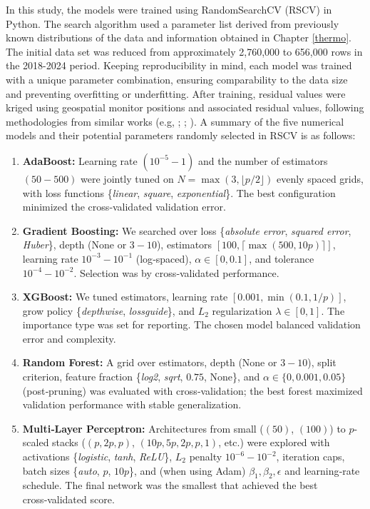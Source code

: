 In this study, the models were trained using RandomSearchCV (RSCV) in Python. The search algorithm used a parameter list derived from previously known distributions of the data and information obtained in Chapter \ref{thermo}. The initial data set was reduced from approximately 2,760,000 to 656,000 rows in the 2018-2024 period. Keeping reproducibility in mind, each model was trained with a unique parameter combination, ensuring comparability to the data size and preventing overfitting or underfitting. After training, residual values were kriged using geospatial monitor positions and associated residual values, following methodologies from similar works (e.g, \cite{anand_gis-based_2021}; \cite{liu_improve_2018}; \cite{oliver_tutorial_2014}). A summary of the five numerical models and their potential parameters randomly selected in RSCV is as follows:
\begin{enumerate}
    \item \textbf{AdaBoost:} Learning rate \((10^{-5}\!-\!1)\) and the number of estimators \((50\!-\!500)\) were jointly tuned on \(N=\max(3,\lfloor p/2\rfloor)\) evenly spaced grids, with loss functions \{\emph{linear}, \emph{square}, \emph{exponential}\}. The best configuration minimized the cross‑validated validation error.
    \item \textbf{Gradient Boosting:} We searched over loss \{\emph{absolute error}, \emph{squared error}, \emph{Huber}\}, depth (None or \(3\!-\!10\)), estimators \([100,\lceil\max(500,10p)\rceil]\), learning rate \(10^{-3}\!-\!10^{-1}\) (log‑spaced), \( \alpha\in[0,0.1]\), and tolerance \(10^{-4}\!-\!10^{-2}\). Selection was by cross‑validated performance.
    \item \textbf{XGBoost:} We tuned estimators, learning rate \([0.001,\min(0.1,1/p)]\), grow policy \{\emph{depthwise}, \emph{lossguide}\}, and \(L_2\) regularization \(\lambda\in[0,1]\). The importance type was set for reporting. The chosen model balanced validation error and complexity.
    \item \textbf{Random Forest:} A grid over estimators, depth (None or \(3\!-\!10\)), split criterion, feature fraction \{\emph{log2}, \emph{sqrt}, \(0.75\), None\}, and \( \alpha\in\{0,0.001,0.05\}\) (post‑pruning) was evaluated with cross‑validation; the best forest maximized validation performance with stable generalization.
    \item \textbf{Multi‑Layer Perceptron:} Architectures from small (\((50)\), \((100)\)) to \(p\)-scaled stacks (\((p,2p,p)\), \((10p,5p,2p,p,1)\), etc.) were explored with activations \{\emph{logistic}, \emph{tanh}, \emph{ReLU}\}, \(L_2\) penalty \(10^{-6}\!-\!10^{-2}\), iteration caps, batch sizes \{\emph{auto}, \(p\), \(10p\)\}, and (when using Adam) \(\beta_1,\beta_2,\epsilon\) and learning‑rate schedule. The final network was the smallest that achieved the best cross‑validated score.
\end{enumerate}

